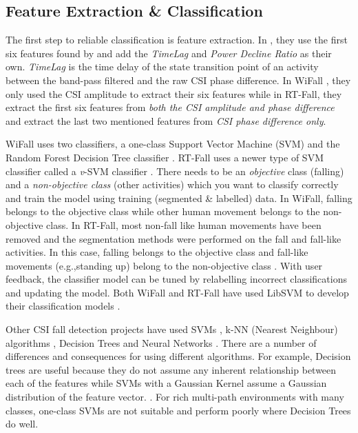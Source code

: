 \subsection{Feature Extraction \& Classification }
The first step to reliable classification is feature extraction. In \cite{RTFall}, they use the first six features found by \cite{WiFall} and add the \textit{TimeLag} and \textit{Power Decline Ratio} as their own. \textit{TimeLag} is the time delay of the state transition point of an activity between the band-pass filtered and the raw CSI phase difference. In WiFall \citep{WiFall}, they only used the CSI amplitude to extract their six features while in RT-Fall, they extract the first six features from \textit{both the CSI amplitude and phase difference} and extract the last two mentioned features from \textit{CSI phase difference only}. \par
WiFall uses two classifiers, a one-class Support Vector Machine (SVM) and the Random Forest Decision Tree classifier \citep{WiFall}. RT-Fall uses a newer type of SVM classifier called a \textit{v}-SVM classifier \citep{newSVM}. There needs to be an \textit{objective} class (falling) and a \textit{non-objective class} (other activities) which you want to classify correctly and train the model using training (segmented \& labelled) data. In WiFall, falling belongs to the objective class while other human movement belongs to the non-objective class. In RT-Fall, most non-fall like human movements have been removed and the segmentation methods were performed on the fall and fall-like activities. In this case, falling belongs to the objective class and fall-like movements (e.g.,standing up) belong to the non-objective class \citep{WiFall,RTFall}. With user feedback, the classifier model can be tuned by relabelling incorrect classifications and updating the model. Both WiFall and RT-Fall have used LibSVM to develop their classification models \citep{LibSVM}. \par
Other CSI fall detection projects have used SVMs \citep{antiFall}, k-NN (Nearest Neighbour) algorithms \citep{robustdevicefree}, Decision Trees \citep{WiFall,Dayal2016HumanFD} and Neural Networks \citep{Dayal2016HumanFD}. There are a number of differences and consequences for using different algorithms. For example, Decision trees are useful because they do not assume any inherent relationship between each of the features while SVMs with a Gaussian Kernel assume a Gaussian distribution of the feature vector. \citep{Dayal2016HumanFD}. For rich multi-path environments with many classes, one-class SVMs are not suitable and perform poorly where Decision Trees do well. \par
